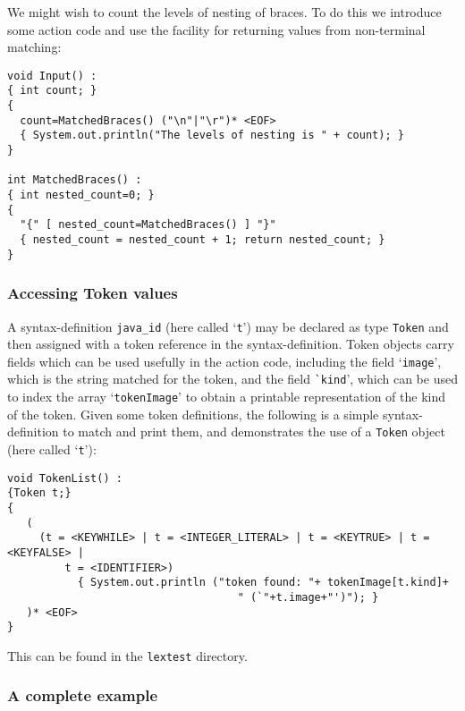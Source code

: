 \documentclass{article}
\begin{document}
We might wish to count the levels of nesting of braces.
To do this we introduce some action code and use the facility for
returning values from non-terminal matching:
\begin{verbatim}
void Input() :
{ int count; }
{
  count=MatchedBraces() ("\n"|"\r")* <EOF>
  { System.out.println("The levels of nesting is " + count); }
}

int MatchedBraces() :
{ int nested_count=0; }
{
  "{" [ nested_count=MatchedBraces() ] "}"
  { nested_count = nested_count + 1; return nested_count; }
}
\end{verbatim}


\subsubsection*{Accessing Token values}

A syntax-definition \verb+java_id+ 
(here called `\verb+t+')
may be declared as type \verb+Token+ 
and then assigned
with a token reference in the syntax-definition. Token objects 
carry fields which can be used usefully in the action code,
including the field `\verb+image+', which is the string matched for the
token, and the field \verb+`kind+', which can be used to index
the array `\verb+tokenImage+' to obtain a printable representation
of the kind of the token. Given some token definitions, the following
is a simple syntax-definition to match and print them, and demonstrates
the use of a \verb+Token+ object
(here called `\verb+t+'):
\begin{verbatim}
void TokenList() :
{Token t;}
{
   (
     (t = <KEYWHILE> | t = <INTEGER_LITERAL> | t = <KEYTRUE> | t = <KEYFALSE> | 
         t = <IDENTIFIER>)
           { System.out.println ("token found: "+ tokenImage[t.kind]+
                                    " (`"+t.image+"')"); }
   )* <EOF>
}
\end{verbatim}
This can be found in the \verb+lextest+ directory.

\subsubsection*{A complete example}
\end{document}
